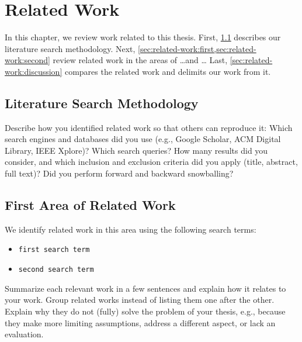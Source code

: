 \chapter{Related Work}\label{chap:related-work}

In this chapter, we review work related to this thesis.
First, \cref{sec:related-work:method} describes our literature search methodology.
Next, \cref{sec:related-work:first,sec:related-work:second} review related work in the areas of \ldots and \ldots
Last, \cref{sec:related-work:discussion} compares the related work and delimits our work from it.

\section{Literature Search Methodology}\label{sec:related-work:method}

Describe how you identified related work so that others can reproduce it:
Which search engines and databases did you use (e.g., Google Scholar, ACM Digital Library, IEEE Xplore)?
Which search queries?
How many results did you consider, and which inclusion and exclusion criteria did you apply (title, abstract, full text)?
Did you perform forward and backward snowballing?

\section{First Area of Related Work}\label{sec:related-work:first}

We identify related work in this area using the following search terms:
\begin{itemize}
  \item \texttt{first search term}
  \item \texttt{second search term}
\end{itemize}

Summarize each relevant work in a few sentences and explain how it relates to your work.
Group related works instead of listing them one after the other.
Explain why they do not (fully) solve the problem of your thesis, e.g., because they make more limiting assumptions, address a different aspect, or lack an evaluation.

